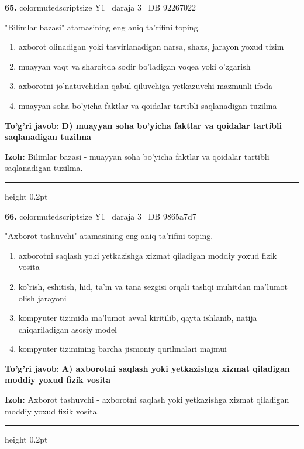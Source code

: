 \documentclass[10pt,a4paper,oneside]{article}
\begin{document}
\noindent\textbf{\color{ink}65.}  {color{muted}scriptsize Y1 \textbullet\ daraja 3 \textbullet\ DB 92267022}
\par
"Bilimlar bazasi" atamasining eng aniq ta'rifini toping.
\begin{enumerate}[label=\Alph*),leftmargin=9mm]
\item axborot olinadigan yoki tasvirlanadigan narsa, shaxs, jarayon yoxud tizim
\item muayyan vaqt va sharoitda sodir bo'ladigan voqea yoki o'zgarish
\item axborotni jo'natuvchidan qabul qiluvchiga yetkazuvchi mazmunli ifoda
\item muayyan soha bo'yicha faktlar va qoidalar tartibli saqlanadigan tuzilma
\end{enumerate}
\begin{tcolorbox}[enhanced,breakable,colback=teal!4,colframe=teal!50!black,boxrule=0.5pt,arc=1.1mm,left=3mm,right=3mm,top=1.7mm,bottom=1.7mm,before skip=2mm,after skip=2mm]
\textbf{\color{teal}To'g'ri javob:} \textbf{D) muayyan soha bo'yicha faktlar va qoidalar tartibli saqlanadigan tuzilma}
\par\smallskip
\textbf{Izoh:} Bilimlar bazasi - muayyan soha bo'yicha faktlar va qoidalar tartibli saqlanadigan tuzilma.
\end{tcolorbox}
\vspace{2mm}\hrule height 0.2pt \vspace{3mm}

\noindent\textbf{\color{ink}66.}  {color{muted}scriptsize Y1 \textbullet\ daraja 3 \textbullet\ DB 9865a7d7}
\par
"Axborot tashuvchi" atamasining eng aniq ta'rifini toping.
\begin{enumerate}[label=\Alph*),leftmargin=9mm]
\item axborotni saqlash yoki yetkazishga xizmat qiladigan moddiy yoxud fizik vosita
\item ko'rish, eshitish, hid, ta'm va tana sezgisi orqali tashqi muhitdan ma'lumot olish jarayoni
\item kompyuter tizimida ma'lumot avval kiritilib, qayta ishlanib, natija chiqariladigan asosiy model
\item kompyuter tizimining barcha jismoniy qurilmalari majmui
\end{enumerate}
\begin{tcolorbox}[enhanced,breakable,colback=teal!4,colframe=teal!50!black,boxrule=0.5pt,arc=1.1mm,left=3mm,right=3mm,top=1.7mm,bottom=1.7mm,before skip=2mm,after skip=2mm]
\textbf{\color{teal}To'g'ri javob:} \textbf{A) axborotni saqlash yoki yetkazishga xizmat qiladigan moddiy yoxud fizik vosita}
\par\smallskip
\textbf{Izoh:} Axborot tashuvchi - axborotni saqlash yoki yetkazishga xizmat qiladigan moddiy yoxud fizik vosita.
\end{tcolorbox}
\vspace{2mm}\hrule height 0.2pt \vspace{3mm}
\end{document}
